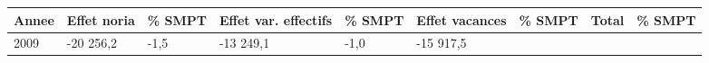 \begin{longtable}[]{@{}lllllllll@{}}
\toprule
\begin{minipage}[b]{0.05\columnwidth}\raggedright
Annee\strut
\end{minipage} & \begin{minipage}[b]{0.10\columnwidth}\raggedright
Effet noria\strut
\end{minipage} & \begin{minipage}[b]{0.06\columnwidth}\raggedright
\% SMPT\strut
\end{minipage} & \begin{minipage}[b]{0.16\columnwidth}\raggedright
Effet var. effectifs\strut
\end{minipage} & \begin{minipage}[b]{0.06\columnwidth}\raggedright
\% SMPT\strut
\end{minipage} & \begin{minipage}[b]{0.12\columnwidth}\raggedright
Effet vacances\strut
\end{minipage} & \begin{minipage}[b]{0.06\columnwidth}\raggedright
\% SMPT\strut
\end{minipage} & \begin{minipage}[b]{0.09\columnwidth}\raggedright
Total\strut
\end{minipage} & \begin{minipage}[b]{0.06\columnwidth}\raggedright
\% SMPT\strut
\end{minipage}\tabularnewline
\midrule
\endhead
\begin{minipage}[t]{0.05\columnwidth}\raggedright
2009\strut
\end{minipage} & \begin{minipage}[t]{0.10\columnwidth}\raggedright
-20 256,2\strut
\end{minipage} & \begin{minipage}[t]{0.06\columnwidth}\raggedright
-1,5\strut
\end{minipage} & \begin{minipage}[t]{0.16\columnwidth}\raggedright
-13 249,1\strut
\end{minipage} & \begin{minipage}[t]{0.06\columnwidth}\raggedright
-1,0\strut
\end{minipage} & \begin{minipage}[t]{0.12\columnwidth}\raggedright
-15 917,5\strut
\end{minipage} & \begin{minipage}[t]{0.06\columnwidth}\raggedright

\end{minipage}
\end{longtable}
